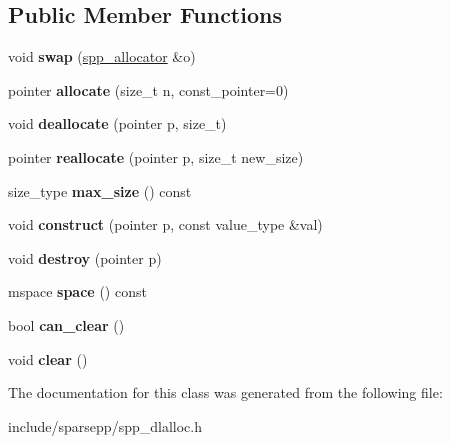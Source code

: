 \subsection*{Public Member Functions}
\begin{DoxyCompactItemize}
\item 
void {\bfseries swap} (\hyperlink{classspp_1_1spp__allocator}{spp\+\_\+allocator} \&o)\hypertarget{classspp_1_1spp__allocator_aaff92a3bea73cc12f4dfb8584b01735a}{}\label{classspp_1_1spp__allocator_aaff92a3bea73cc12f4dfb8584b01735a}

\item 
pointer {\bfseries allocate} (size\+\_\+t n, const\+\_\+pointer=0)\hypertarget{classspp_1_1spp__allocator_adf48575cf452ef23c813d61079a46df8}{}\label{classspp_1_1spp__allocator_adf48575cf452ef23c813d61079a46df8}

\item 
void {\bfseries deallocate} (pointer p, size\+\_\+t)\hypertarget{classspp_1_1spp__allocator_adc09ea2a328ff056f80431da0f368eba}{}\label{classspp_1_1spp__allocator_adc09ea2a328ff056f80431da0f368eba}

\item 
pointer {\bfseries reallocate} (pointer p, size\+\_\+t new\+\_\+size)\hypertarget{classspp_1_1spp__allocator_aadc82769b68b3261f1f11c6d88f402a6}{}\label{classspp_1_1spp__allocator_aadc82769b68b3261f1f11c6d88f402a6}

\item 
size\+\_\+type {\bfseries max\+\_\+size} () const \hypertarget{classspp_1_1spp__allocator_a914455121ca077ec3e0c5a52e54aa9ca}{}\label{classspp_1_1spp__allocator_a914455121ca077ec3e0c5a52e54aa9ca}

\item 
void {\bfseries construct} (pointer p, const value\+\_\+type \&val)\hypertarget{classspp_1_1spp__allocator_a2c6e3dc552c681541a23d13f28ac3651}{}\label{classspp_1_1spp__allocator_a2c6e3dc552c681541a23d13f28ac3651}

\item 
void {\bfseries destroy} (pointer p)\hypertarget{classspp_1_1spp__allocator_a085c81a02dfd2a82e8f38b727f65d592}{}\label{classspp_1_1spp__allocator_a085c81a02dfd2a82e8f38b727f65d592}

\item 
mspace {\bfseries space} () const \hypertarget{classspp_1_1spp__allocator_ab73f9981b8a019786bad7f9fecc411e0}{}\label{classspp_1_1spp__allocator_ab73f9981b8a019786bad7f9fecc411e0}

\item 
bool {\bfseries can\+\_\+clear} ()\hypertarget{classspp_1_1spp__allocator_af12ef026712e33c220249910cd635899}{}\label{classspp_1_1spp__allocator_af12ef026712e33c220249910cd635899}

\item 
void {\bfseries clear} ()\hypertarget{classspp_1_1spp__allocator_ac9c759007ae751afa9973a5e894411a3}{}\label{classspp_1_1spp__allocator_ac9c759007ae751afa9973a5e894411a3}

\end{DoxyCompactItemize}


The documentation for this class was generated from the following file\+:\begin{DoxyCompactItemize}
\item 
include/sparsepp/spp\+\_\+dlalloc.\+h\end{DoxyCompactItemize}
